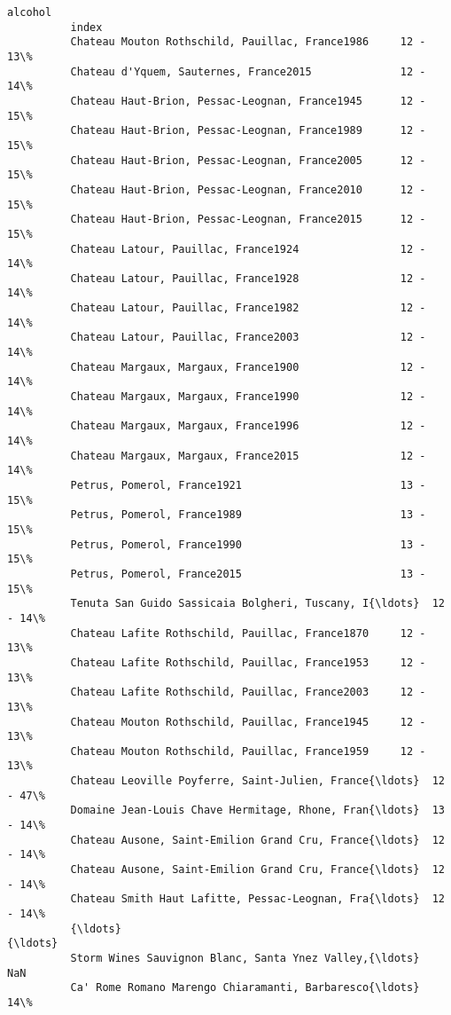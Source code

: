 \documentclass[11pt]{article}
\begin{document}
\begin{Verbatim}[commandchars=\\\{\}]
                                                               alcohol  
          index                                                         
          Chateau Mouton Rothschild, Pauillac, France1986     12 - 13\%  
          Chateau d'Yquem, Sauternes, France2015              12 - 14\%  
          Chateau Haut-Brion, Pessac-Leognan, France1945      12 - 15\%  
          Chateau Haut-Brion, Pessac-Leognan, France1989      12 - 15\%  
          Chateau Haut-Brion, Pessac-Leognan, France2005      12 - 15\%  
          Chateau Haut-Brion, Pessac-Leognan, France2010      12 - 15\%  
          Chateau Haut-Brion, Pessac-Leognan, France2015      12 - 15\%  
          Chateau Latour, Pauillac, France1924                12 - 14\%  
          Chateau Latour, Pauillac, France1928                12 - 14\%  
          Chateau Latour, Pauillac, France1982                12 - 14\%  
          Chateau Latour, Pauillac, France2003                12 - 14\%  
          Chateau Margaux, Margaux, France1900                12 - 14\%  
          Chateau Margaux, Margaux, France1990                12 - 14\%  
          Chateau Margaux, Margaux, France1996                12 - 14\%  
          Chateau Margaux, Margaux, France2015                12 - 14\%  
          Petrus, Pomerol, France1921                         13 - 15\%  
          Petrus, Pomerol, France1989                         13 - 15\%  
          Petrus, Pomerol, France1990                         13 - 15\%  
          Petrus, Pomerol, France2015                         13 - 15\%  
          Tenuta San Guido Sassicaia Bolgheri, Tuscany, I{\ldots}  12 - 14\%  
          Chateau Lafite Rothschild, Pauillac, France1870     12 - 13\%  
          Chateau Lafite Rothschild, Pauillac, France1953     12 - 13\%  
          Chateau Lafite Rothschild, Pauillac, France2003     12 - 13\%  
          Chateau Mouton Rothschild, Pauillac, France1945     12 - 13\%  
          Chateau Mouton Rothschild, Pauillac, France1959     12 - 13\%  
          Chateau Leoville Poyferre, Saint-Julien, France{\ldots}  12 - 47\%  
          Domaine Jean-Louis Chave Hermitage, Rhone, Fran{\ldots}  13 - 14\%  
          Chateau Ausone, Saint-Emilion Grand Cru, France{\ldots}  12 - 14\%  
          Chateau Ausone, Saint-Emilion Grand Cru, France{\ldots}  12 - 14\%  
          Chateau Smith Haut Lafitte, Pessac-Leognan, Fra{\ldots}  12 - 14\%  
          {\ldots}                                                      {\ldots}  
          Storm Wines Sauvignon Blanc, Santa Ynez Valley,{\ldots}       NaN  
          Ca' Rome Romano Marengo Chiaramanti, Barbaresco{\ldots}       14\%  

\end{Verbatim}
\end{document}
